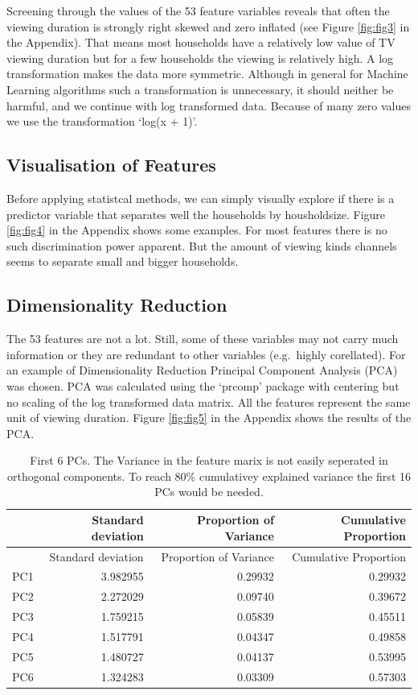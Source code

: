 \documentclass[]{article}
\begin{document}
Screening through the values of the 53 feature variables reveals that
often the viewing duration is strongly right skewed and zero inflated
(see Figure \ref{fig:fig3} in the Appendix). That means most households
have a relatively low value of TV viewing duration but for a few
households the viewing is relatively high. A log transformation makes
the data more symmetric. Although in general for Machine Learning
algorithms such a transformation is unnecessary, it should neither be
harmful, and we continue with log transformed data. Because of many zero
values we use the transformation `log(x + 1)'.

\hypertarget{visualisation-of-features}{%
\subsection{Visualisation of Features}\label{visualisation-of-features}}

Before applying statistcal methods, we can simply visually explore if
there is a predictor variable that separates well the households by
housholdsize. Figure \ref{fig:fig4} in the Appendix shows some examples.
For most features there is no such discrimination power apparent. But
the amount of viewing kinds channels seems to separate small and bigger
households.

\hypertarget{dimensionality-reduction}{%
\subsection{Dimensionality Reduction}\label{dimensionality-reduction}}

The 53 features are not a lot. Still, some of these variables may not
carry much information or they are redundant to other variables
(e.g.~highly corellated). For an example of Dimensionality Reduction
Principal Component Analysis (PCA) was chosen. PCA was calculated using
the `prcomp' package with centering but no scaling of the log
transformed data matrix. All the features represent the same unit of
viewing duration. Figure \ref{fig:fig5} in the Appendix shows the
results of the PCA.

\begin{longtable}[]{@{}lrrr@{}}
\caption{\label{tab:tab5} First 6 PCs. The Variance in the feature marix
is not easily seperated in orthogonal components. To reach 80\%
cumulativey explained variance the first 16 PCs would be
needed.}\tabularnewline
\toprule
& Standard deviation & Proportion of Variance & Cumulative
Proportion\tabularnewline
\midrule
\endfirsthead
\toprule
& Standard deviation & Proportion of Variance & Cumulative
Proportion\tabularnewline
\midrule
\endhead
PC1 & 3.982955 & 0.29932 & 0.29932\tabularnewline
PC2 & 2.272029 & 0.09740 & 0.39672\tabularnewline
PC3 & 1.759215 & 0.05839 & 0.45511\tabularnewline
PC4 & 1.517791 & 0.04347 & 0.49858\tabularnewline
PC5 & 1.480727 & 0.04137 & 0.53995\tabularnewline
PC6 & 1.324283 & 0.03309 & 0.57303\tabularnewline
\bottomrule
\end{longtable}
\end{document}
